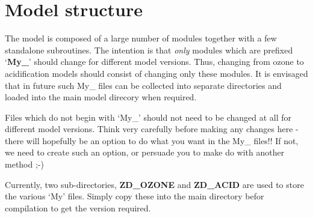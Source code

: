 \chapter{Model structure}

The model is composed of a large number of modules together with a few
standalone subroutines. The intention is that \emph{only}
modules which are prefixed `{\bf My\_}'  should change for different
model versions. Thus, changing from ozone to acidification models
should consist of changing only these modules. It is envisaged that
in future such My\_ files can be collected into separate directories
and loaded into the main model direcory when required.

Files which do not begin with `My\_' should not need to be changed
at all for different model versions. Think very carefully before
making any changes here - there will hopefully be an option to
do what you want  in the My\_ files!! If not, we need to create
such an option, or persuade you to make do with another method ;-)


Currently, two sub-directories, {\bf ZD\_OZONE} and {\bf ZD\_ACID}
are used to store the various `My' files. Simply copy these
into the main directory befor compilation to get the version required.

